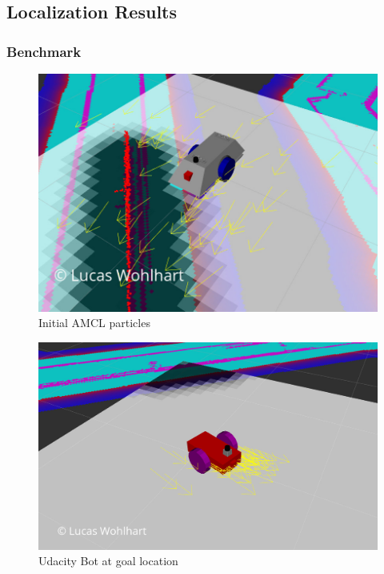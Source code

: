 \documentclass[10pt,journal,compsoc]{IEEEtran}
\begin{document}
\subsection{Localization Results}
\subsubsection{Benchmark}
\begin{figure}[thpb]
      \centering
      \includegraphics[width=\linewidth]{img/particles_initial}
      \caption{Initial AMCL particles}
      \label{fig:initial_amcl_particles}
\end{figure}
\begin{figure}[thpb]
      \centering
      \includegraphics[width=\linewidth]{img/udacity_bot_goal_location}
      \caption{Udacity Bot at goal location}
      \label{fig:udacity_bot_goal_location}
\end{figure}
\end{document}
